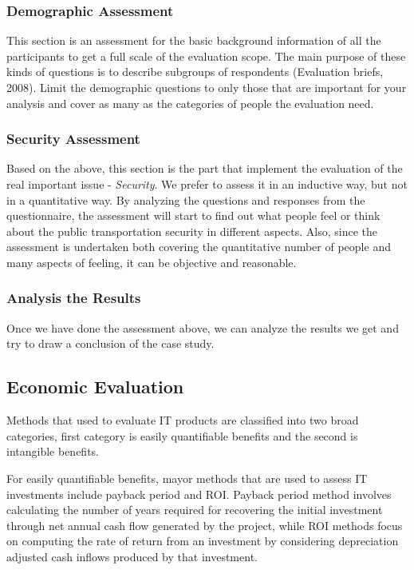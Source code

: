 \documentclass[twocolumn]{article}
\begin{document}
\subsubsection{Demographic Assessment}
This section is an assessment for the basic background information of all the participants to get a full scale of the evaluation scope. The main purpose of these kinds of questions is to describe subgroups of respondents (Evaluation briefs, 2008). Limit the demographic questions to only those that are important for your analysis and cover as many as the categories of people the evaluation need.

\subsubsection{Security Assessment}
Based on the above, this section is the part that implement the evaluation of the real important issue - \emph{Security}. We prefer to assess it in an inductive way, but not in a quantitative way. By analyzing the questions and responses from the questionnaire, the assessment will start to find out what people feel or think about the public transportation security in different aspects. Also, since the assessment is undertaken both covering the quantitative number of people and many  aspects of feeling, it can be objective and reasonable.

\subsubsection{Analysis the Results}
Once we have done the assessment above, we can analyze the results we get and try to draw a conclusion of the case study.

\subsection{Economic Evaluation}
Methods that used to evaluate IT products are classified into two broad categories, first category is easily quantifiable benefits and the second is intangible benefits.

For easily quantifiable benefits, mayor methods that are used to assess IT investments include payback period and ROI. Payback period method involves calculating the number of years required for recovering the initial investment through net annual cash flow generated by the project, while ROI methods focus on computing the rate of return from an investment by considering depreciation adjusted cash inflows produced by that investment.
\end{document}
